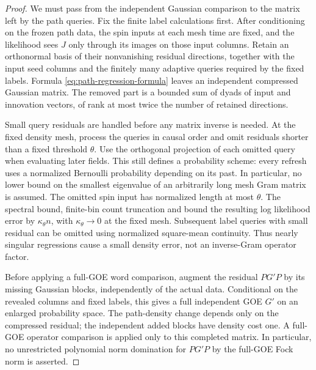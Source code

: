 \begin{proof}
We must pass from the independent Gaussian comparison to the matrix
left by the path queries.  Fix the finite label calculations first.
After conditioning on the frozen path data, the spin inputs at each
mesh time are fixed, and the likelihood sees $J$ only through its
images on those input columns.  Retain an orthonormal basis of their
nonvanishing residual directions, together with the input seed columns
and the finitely many adaptive queries required by the fixed labels.
Formula \eqref{eq:path-regression-formula} leaves an independent
compressed Gaussian matrix.  The removed part is a bounded sum of
dyads of input and innovation vectors, of rank at most twice the
number of retained directions.

Small query residuals are handled before any matrix inverse is needed.
At the fixed density mesh, process the queries in causal order and
omit residuals shorter than a fixed threshold $\theta$.  Use the
orthogonal projection of each omitted query when evaluating later
fields.  This still defines a probability scheme: every refresh uses
a normalized Bernoulli probability depending on its past.  In
particular, no lower bound on the smallest eigenvalue of an
arbitrarily long mesh Gram matrix is assumed.
The omitted spin input has normalized length at most $\theta$.
The spectral bound, finite-bin count truncation and
 bound the resulting log likelihood error by
$\kappa_\theta n$, with $\kappa_\theta\to0$ at the fixed mesh.
Subsequent label queries with small residual can be omitted using
normalized square-mean continuity.  Thus nearly singular regressions
cause a small density error, not an inverse-Gram operator factor.

Before applying a full-GOE word comparison, augment the residual
$PG'P$ by its missing Gaussian blocks, independently of the actual data.
Conditional on the revealed columns and fixed labels, this gives a full
independent GOE $G'$ on an enlarged probability space. The path-density
change depends only on the compressed residual; the independent added
blocks have density cost one. A full-GOE operator comparison is applied
only to this completed matrix. In particular, no unrestricted polynomial
norm domination for $PG'P$ by the full-GOE Fock norm is asserted.


\end{proof}
